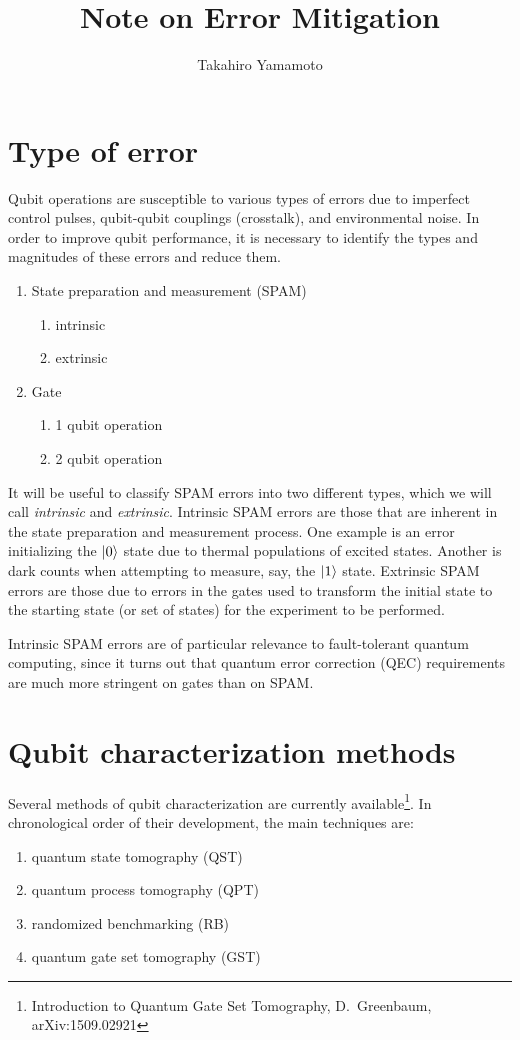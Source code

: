 \documentclass[11pt, oneside]{article}   	%
\title{Note on Error Mitigation}
\author{Takahiro Yamamoto}
\begin{document}
\maketitle
\section{Type of error}
Qubit operations are susceptible to various types of errors due to imperfect control pulses, qubit-qubit couplings (crosstalk), and environmental noise. In order to improve qubit performance, it is necessary to identify the types and magnitudes of these errors and reduce them.
\begin{enumerate}
\item State preparation and measurement (SPAM)
\begin{enumerate}
\item intrinsic
\item extrinsic
\end{enumerate}
\item Gate
\begin{enumerate}
\item {1 qubit operation}
\item {2 qubit operation}
\end{enumerate}
\end{enumerate}

It will be useful to classify SPAM errors into two different types, which we will call {\em intrinsic} and {\em extrinsic}. 
Intrinsic SPAM errors are those that are inherent in the state preparation and measurement process. 
One example is an error initializing the $\ket{0}$ state due to thermal populations of excited states. 
Another is dark counts when attempting to measure, say, the $\ket{1}$ state. 
Extrinsic SPAM errors are those due to errors in the gates used to transform the initial state to the starting state (or set of states) for the experiment to be performed. 

Intrinsic SPAM errors are of particular relevance to fault-tolerant quantum computing, since it turns out that quantum error correction (QEC) requirements are much more stringent on gates than on SPAM. 

\section{Qubit characterization methods}
Several methods of qubit characterization are currently available\footnote{Introduction to Quantum Gate Set Tomography, D.~Greenbaum, arXiv:1509.02921}. 
In chronological order of their development, the main techniques are:
\begin{enumerate}
\item quantum state tomography (QST)
\item quantum process tomography (QPT)
\item randomized benchmarking (RB)
\item quantum gate set tomography (GST)
\end{enumerate}
\end{document}
